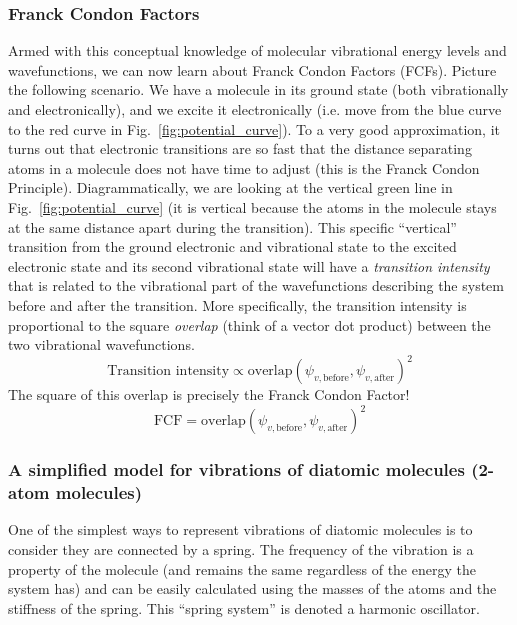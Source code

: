 \documentclass[12pt]{article}
\begin{document}
\subsubsection{Franck Condon Factors}

Armed with this conceptual knowledge of molecular vibrational energy levels and wavefunctions, we can now learn about Franck Condon Factors (FCFs). Picture the following scenario. We have a molecule in its ground state (both vibrationally and electronically), and we excite it electronically (i.e. move from the blue curve to the red curve in Fig.~\ref{fig:potential_curve}). To a very good approximation, it turns out that electronic transitions are so fast that the distance separating atoms in a molecule does not have time to adjust (this is the Franck Condon Principle). Diagrammatically, we are looking at the vertical green line in Fig.~\ref{fig:potential_curve} (it is vertical because the atoms in the molecule stays at the same distance apart during the transition). This specific ``vertical'' transition from the ground electronic and vibrational state to the excited electronic state and its second vibrational state will have a \textit{transition intensity} that is related to the vibrational part of the wavefunctions describing the system before and after the transition. More specifically, the transition intensity is proportional to the square \textit{overlap} (think of a vector dot product) between the two vibrational wavefunctions.
\begin{equation}
    \text{Transition}\text{ intensity} \propto \text{overlap}(\psi_{v,\text{before}},\psi_{v,\text{after}})^2
\end{equation}
The square of this overlap is precisely the Franck Condon Factor!
\begin{equation}
    \text{FCF} = \text{overlap}(\psi_{v,\text{before}},\psi_{v,\text{after}})^2
\end{equation}

\subsubsection{A simplified model for vibrations of diatomic molecules (2-atom molecules)}
One of the simplest ways to represent vibrations of diatomic molecules is to consider they are connected by a spring. The frequency of the vibration is a property of the molecule (and remains the same regardless of the energy the system has) and can be easily calculated using the masses of the atoms and the stiffness of the spring. This ``spring system'' is denoted a harmonic oscillator.
\end{document}
